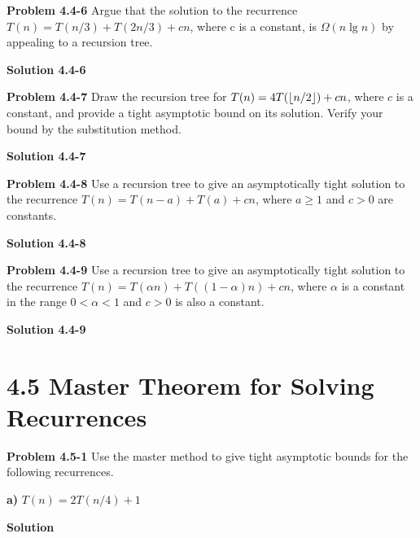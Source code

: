 \documentclass{article}
\DeclarePairedDelimiter\floor{\lfloor}{\rfloor}
\begin{document}
\hrulefill

\medskip

\textbf{Problem 4.4-6} Argue that the solution to the recurrence $T(n) = T(n/3) + T(2n/3) + cn$, where c is a constant, is  $\Omega(n \lg n)$ by appealing to a recursion tree.

\medskip

\textbf{Solution 4.4-6}

\hrulefill

\medskip

\textbf{Problem 4.4-7} Draw the recursion tree for $T(n) = 4T(\floor{n/2}) + cn$, where $c$ is a constant, and provide a tight asymptotic bound on its solution. Verify your bound by the substitution method.

\medskip

\textbf{Solution 4.4-7}

\hrulefill

\medskip

\textbf{Problem 4.4-8} Use a recursion tree to give an asymptotically tight solution to the recurrence $T(n) = T(n - a) + T(a) + cn$, where $a \geq 1$ and $c > 0$ are constants.

\medskip

\textbf{Solution 4.4-8}

\hrulefill

\medskip

\textbf{Problem 4.4-9} Use a recursion tree to give an asymptotically tight solution to the recurrence $T(n) = T(\alpha n) + T((1 - \alpha)n) + cn$, where $\alpha$ is a constant in the range $0 < \alpha < 1$ and $c > 0$ is also a constant.

\medskip

\textbf{Solution 4.4-9}

\hrulefill

\section*{4.5 Master Theorem for Solving Recurrences}

\hrulefill

\medskip

\textbf{Problem 4.5-1} Use the master method to give tight asymptotic bounds for the following recurrences.

\medskip

\textbf{a)} $T(n) = 2T(n/4) + 1$

\medskip

\textbf{Solution}
\end{document}
